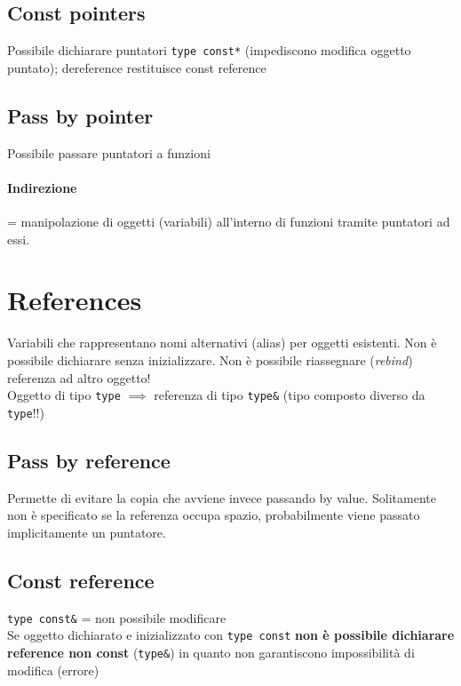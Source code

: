 \documentclass[10pt, oneside]{book}
\begin{document}
\subsection{Const pointers}
Possibile dichiarare puntatori \texttt{type const*} (impediscono modifica oggetto puntato); dereference restituisce const reference

\subsection{Pass by pointer}
Possibile passare puntatori a funzioni
\paragraph{Indirezione} = manipolazione di oggetti (variabili) all'interno di funzioni tramite puntatori ad essi.

\section{References}
Variabili che rappresentano nomi alternativi (alias) per oggetti esistenti. Non è possibile dichiarare senza inizializzare. Non è possibile riassegnare (\textit{rebind}) referenza ad altro oggetto!\\
Oggetto di tipo \texttt{type} $\implies$ referenza di tipo \texttt{type\&} (tipo composto diverso da \texttt{type}!!)

\subsection{Pass by reference}
Permette di evitare la copia che avviene invece passando by value. Solitamente non è specificato se la referenza occupa spazio, probabilmente viene passato implicitamente un puntatore.

\subsection{Const reference}
\texttt{type const\&} = non possibile modificare\\
Se oggetto dichiarato e inizializzato con \texttt{type const} \textbf{non è possibile dichiarare reference non const} (\texttt{type\&}) in quanto non garantiscono impossibilità di modifica (errore)
\end{document}
